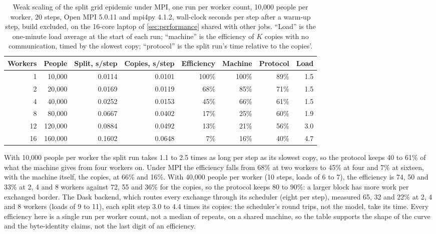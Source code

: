 \begin{table}[htbp]
  \centering
  \small
  \caption{Weak scaling of the split grid epidemic under MPI, one run per worker count, 10,000
  people per worker, 20 steps, Open MPI 5.0.11 and mpi4py 4.1.2, wall-clock seconds per step after a
  warm-up step, build excluded, on the 16-core laptop of \cref{sec:performance} shared with
  other jobs. ``Load'' is the one-minute load average at the start of each run; ``machine'' is
  the efficiency of $K$ copies with no communication, timed by the slowest copy; ``protocol'' is the split run's time
  relative to the copies'.}
  \label{tab:scaling}
  \begin{tabular}{rrrrrrrr}
    \toprule
    Workers & People & Split, s/step & Copies, s/step & Efficiency & Machine & Protocol & Load \\
    \midrule
    1  & 10,000  & 0.0114 & 0.0101 & 100\% & 100\% & 89\%  & 1.5 \\
    2  & 20,000  & 0.0169 & 0.0119 & 68\%  & 85\%  & 71\%  & 1.5 \\
    4  & 40,000  & 0.0252 & 0.0153 & 45\%  & 66\%  & 61\%  & 1.5 \\
    8  & 80,000  & 0.0667 & 0.0402 & 17\%  & 25\%  & 60\%  & 1.9 \\
    12 & 120,000 & 0.0884 & 0.0492 & 13\%  & 21\%  & 56\%  & 3.0 \\
    16 & 160,000 & 0.1602 & 0.0648 & 7\%   & 16\%  & 40\%  & 4.7 \\
    \bottomrule
  \end{tabular}
\end{table}

With 10,000 people per worker the split run takes 1.1 to 2.5 times as long per step as its
slowest copy, so the protocol keeps 40 to 61\% of what the machine gives from four workers on.
Under MPI the efficiency falls from 68\% at two workers to 45\% at four and 7\% at
sixteen, with the machine itself, the copies, at 66\% and 16\%. With 40,000 people per worker
(10 steps, loads of 6 to 7), the efficiency is 74, 50 and 33\% at 2, 4 and 8 workers against
72, 55 and 36\% for the copies, so the protocol keeps 80 to 90\%: a larger block has more
work per exchanged border. The Dask backend, which routes every exchange through its
scheduler (eight per step), measured 65, 32 and 22\% at 2, 4 and 8 workers (loads of 9 to 11),
each split step 3.0 to 4.4 times its copies: the scheduler's round trips, not the model, take
its time. Every efficiency here is a single run per worker count, not a median of repeats,
on a shared machine, so the table supports the shape of the curve and the
byte-identity claims, not the last digit of an efficiency.

